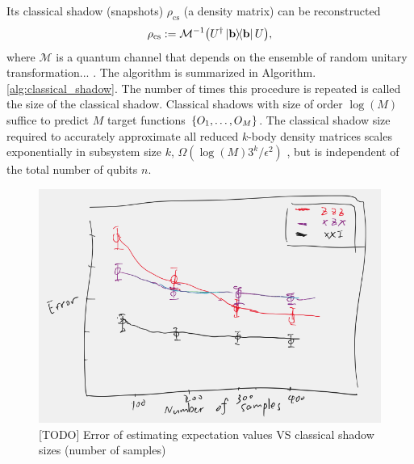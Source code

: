 \documentclass[
aps,
pra,
twocolumn,
floatfix,
]{revtex4-2}
\theoremstyle{plain}
\newtheorem{theorem}{Theorem}
\newtheorem{lemma}{Lemma}
\theoremstyle{definition}
\newcommand{\ob}{O}
\newcommand{\dm}{\rho}
\newcommand{\cs}{\text{cs}}
\newcommand{\shadow}{\textup{shadow}}
\begin{document}
Its classical shadow (snapshots) $\dm_{\cs}$ (a density matrix) can be reconstructed
\begin{equation}
	\dm_{\cs} := \mathcal{M}^{-1} \qty(U^\dagger \op{\vb{b}} U),
\end{equation}
where $\mathcal{M}$ is a quantum channel that depends on the ensemble of random unitary transformation... .
The algorithm is summarized in Algorithm. \ref{alg:classical_shadow}.
The number of times this procedure is repeated is called the size of the classical shadow. 
Classical shadows with size of order $\log(M)$ suffice to predict $M$ target functions $\qty{\ob_1,\dots,\ob_M}$.
The classical shadow size required to accurately approximate all reduced $k$-body density matrices scales exponentially in subsystem size $k$, $\Omega(\log(M) 3^k/\epsilon^2)$ \cite{huangPredictingManyProperties2020}, but is independent of the total number of qubits $n$.
\begin{figure}[!ht]
	\centering
	\includegraphics[width=.9\linewidth]{shadow.png}
	\caption{[TODO] Error of estimating expectation values VS classical shadow sizes (number of samples)}
	\label{fig:shadow}
\end{figure}
\end{document}

